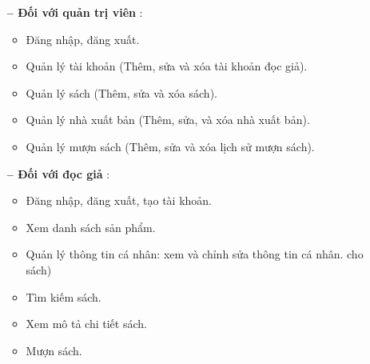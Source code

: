 \begin{itemize}[align=left, leftmargin=2cm]
  \item[\textbf{-- Đối với quản trị viên}]:
        \begin{itemize}[label={+}]
          \item Đăng nhập, đăng xuất.
          \item Quản lý tài khoản (Thêm, sửa và xóa tài khoản đọc giả).
          \item Quản lý sách (Thêm, sửa và xóa sách).
          \item Quản lý nhà xuất bản (Thêm, sửa, và xóa nhà xuất bản).
          \item Quản lý mượn sách (Thêm, sửa và xóa lịch sử mượn sách).
        \end{itemize}
  \item[\textbf{-- Đối với đọc giả}]:
        \begin{itemize}[label={+}]
          \item Đăng nhập, đăng xuất, tạo tài khoản.
          \item Xem danh sách sản phẩm.
          \item Quản lý thông tin cá nhân: xem và chỉnh sửa thông tin cá nhân. cho sách)
          \item Tìm kiếm sách.
          \item Xem mô tả chi tiết sách.
          \item Mượn sách.
        \end{itemize}
\end{itemize}
